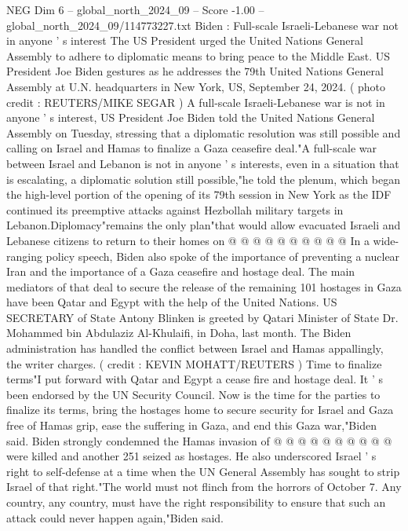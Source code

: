 \begin{textsample}{NEG Dim 6 – global\_north\_2024\_09 – Score -1.00 – global\_north\_2024\_09/114773227.txt}  \label{ex:f6_neg_087}
Biden : Full-scale Israeli-Lebanese war not in anyone ' s interest The US President urged the United Nations General Assembly to adhere to diplomatic means to bring peace to the Middle East.
US President Joe Biden gestures as he addresses the 79th United Nations General Assembly at U.N. headquarters in New York, US, September 24, 2024. ( photo credit : REUTERS/MIKE SEGAR ) A full-scale Israeli-Lebanese war is not in anyone ' s interest, US President Joe Biden told the United Nations General Assembly on Tuesday, stressing that a diplomatic resolution was still possible and calling on Israel and Hamas to finalize a Gaza ceasefire deal."A full-scale war between Israel and Lebanon is not in anyone ' s interests, even in a situation that is escalating, a diplomatic solution still possible,"he told the plenum, which began the high-level portion of the opening of its 79th session in New York as the IDF continued its preemptive attacks against Hezbollah military targets in Lebanon.Diplomacy"remains the only plan"that would allow evacuated Israeli and Lebanese citizens to return to their homes on @ @ @ @ @ @ @ @ @ @ In a wide-ranging policy speech, Biden also spoke of the importance of preventing a nuclear Iran and the importance of a Gaza ceasefire and hostage deal.
The main mediators of that deal to secure the release of the remaining 101 hostages in Gaza have been Qatar and Egypt with the help of the United Nations.
US SECRETARY of State Antony Blinken is greeted by Qatari Minister of State Dr.
Mohammed bin Abdulaziz Al-Khulaifi, in Doha, last month.
The Biden administration has handled the conflict between Israel and Hamas appallingly, the writer charges. ( credit : KEVIN MOHATT/REUTERS ) Time to finalize terms"I put forward with Qatar and Egypt a cease fire and hostage deal.
It ' s been endorsed by the UN Security Council.
Now is the time for the parties to finalize its terms, bring the hostages home to secure security for Israel and Gaza free of Hamas grip, ease the suffering in Gaza, and end this Gaza war,"Biden said.
Biden strongly condemned the Hamas invasion of @ @ @ @ @ @ @ @ @ @ were killed and another 251 seized as hostages.
He also underscored Israel ' s right to self-defense at a time when the UN General Assembly has sought to strip Israel of that right."The world must not flinch from the horrors of October 7.
Any country, any country, must have the right responsibility to ensure that such an attack could never happen again,"Biden said.

\end{textsample}
